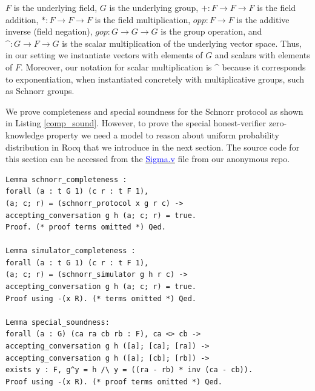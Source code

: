 \documentclass[sigconf, anonymous]{acmart}
\begin{document}
\noindent
 $F$ is the underlying field, $G$ is the underlying group,
 $+ : F \rightarrow F \rightarrow F$ is the field addition,
 $* : F \rightarrow F \rightarrow F$ is the field multiplication, 
 $opp : F \rightarrow F$ is the additive inverse (field negation),
 $gop : G \rightarrow G \rightarrow G$ is the group operation, and
 $\mbox{\textasciicircum}: G \rightarrow F \rightarrow G$ is the scalar multiplication of the underlying vector space.  
Thus, in our setting we instantiate vectors with elements of $G$ and scalars with elements of $F$. 
Moreover, our notation for scalar multiplication is $\mbox{\textasciicircum}$ because it corresponds to exponentiation, 
when instantiated concretely with multiplicative groups, such as Schnorr groups.

We prove completeness and special soundness for the Schnorr protocol 
as shown in Listing \ref{comp_sound}. However, to prove the special honest-verifier 
zero-knowledge property we need a model to reason about uniform probability 
distribution in Rocq that we introduce in the next section. The source code for this section can be accessed from the
\href{https://anonymous.4open.science/r/SigmaProtocol-EBA5/src/Crypto/Sigma.v}{\textcolor{blue}{Sigma.v}} file from our anonymous repo.
 


\begin{lstlisting}[frame=single, language=Coq, caption={Completeness and Soundness},
  label={comp_sound},captionpos=t, basicstyle=\ttfamily\footnotesize,
  abovecaptionskip=-\medskipamount]
Lemma schnorr_completeness : 
forall (a : t G 1) (c r : t F 1),
(a; c; r) = (schnorr_protocol x g r c) ->
accepting_conversation g h (a; c; r) = true.
Proof. (* proof terms omitted *) Qed.
  
Lemma simulator_completeness : 
forall (a : t G 1) (c r : t F 1),
(a; c; r) = (schnorr_simulator g h r c) ->
accepting_conversation g h (a; c; r) = true.
Proof using -(x R). (* terms omitted *) Qed. 
  
Lemma special_soundness: 
forall (a : G) (ca ra cb rb : F), ca <> cb ->
accepting_conversation g h ([a]; [ca]; [ra]) ->  
accepting_conversation g h ([a]; [cb]; [rb]) ->
exists y : F, g^y = h /\ y = ((ra - rb) * inv (ca - cb)).
Proof using -(x R). (* proof terms omitted *) Qed.
  
\end{lstlisting}
 
\end{document}
